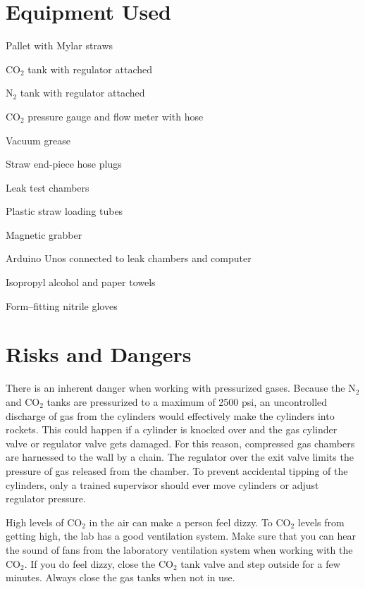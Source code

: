 \documentclass[A4,12pt]{article}
\begin{document}

\section{Equipment Used}
\begin{multicols}{2}
\begin{myitemize}
	\item Pallet with Mylar straws
	\item CO$_2$ tank with regulator attached
	\item N$_2$ tank with regulator attached
	\item CO$_2$ pressure gauge and flow meter with hose 
	\item Vacuum grease
	\item Straw end-piece hose plugs
	\item Leak test chambers
	\item Plastic straw loading tubes
	\item Magnetic grabber
	\item Arduino Unos connected to leak chambers and computer
	\item Isopropyl alcohol and paper towels
	\item Form--fitting nitrile gloves
\end{myitemize}
\end{multicols}


\section{Risks and Dangers}
There is an inherent danger when working with pressurized gases. Because the N$_2$ and CO$_2$ tanks are pressurized to a maximum of 2500 psi, an uncontrolled discharge of gas from the cylinders would effectively make the cylinders into rockets. This could happen if a cylinder is knocked over and the gas cylinder valve or regulator valve gets damaged. For this reason, compressed gas chambers are harnessed to the wall by a chain. The regulator over the exit valve limits the pressure of gas released from the chamber. To prevent accidental tipping of the cylinders, only a trained supervisor should ever move cylinders or adjust regulator pressure. 

High levels of CO$_2$ in the air can make a person feel dizzy. To CO$_2$ levels from getting high, the lab has a good ventilation system. Make sure that you can hear the sound of fans from the laboratory ventilation system when working with the CO$_2$. If you do feel dizzy, close the CO$_2$ tank valve and step outside for a few minutes. Always close the gas tanks when not in use.
\end{document}
